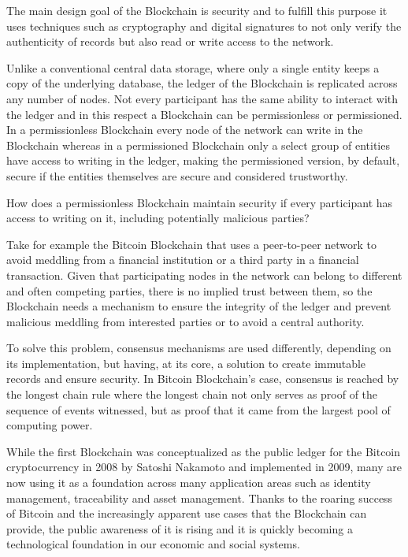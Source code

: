 \documentclass[]{llncs}
\begin{document}
The main design goal of the Blockchain is security and to fulfill this purpose
it uses techniques such as cryptography and digital signatures to not only
verify the authenticity of records but also read or write access to the
network.

Unlike a conventional central data storage, where only a single entity keeps a
copy of the underlying database, the ledger of the Blockchain is replicated
across any number of nodes.  Not every participant has the same ability to
interact with the ledger and in this respect a Blockchain can be permissionless
or permissioned. In a permissionless Blockchain every node of the network can
write in the Blockchain whereas in a permissioned Blockchain only a select
group of entities have access to writing in the ledger, making the permissioned
version, by default, secure if the entities themselves are secure and
considered trustworthy.

How does a permissionless Blockchain maintain security if every participant has
access to writing on it, including potentially malicious parties?

Take for example the Bitcoin Blockchain that uses a peer-to-peer network to
avoid meddling from a financial institution or a third party in a financial
transaction. Given that participating nodes in the network can belong to
different and often competing parties, there is no implied trust between them,
so the Blockchain needs a mechanism to ensure the integrity of the ledger and
prevent malicious meddling from interested parties or to avoid a central
authority.\cite{Barclay2017}

To solve this problem, consensus mechanisms are used differently, depending on
its implementation, but having, at its core, a solution to create immutable
records and ensure security.  In Bitcoin Blockchain’s case, consensus is
reached by the longest chain rule where the longest chain not only serves as
proof of the sequence of events witnessed, but as proof that it came from the
largest pool of computing power.\cite{Baars2016}

While the first Blockchain was conceptualized as the public ledger for the
Bitcoin cryptocurrency in 2008 by Satoshi Nakamoto and implemented in 2009,
many are now using it as a foundation across many application areas such as
identity management, traceability and asset management.  Thanks to the roaring
success of Bitcoin and the increasingly apparent use cases that the Blockchain
can provide, the public awareness of it is rising and it is quickly becoming a
technological foundation in our economic and social systems.
\end{document}

